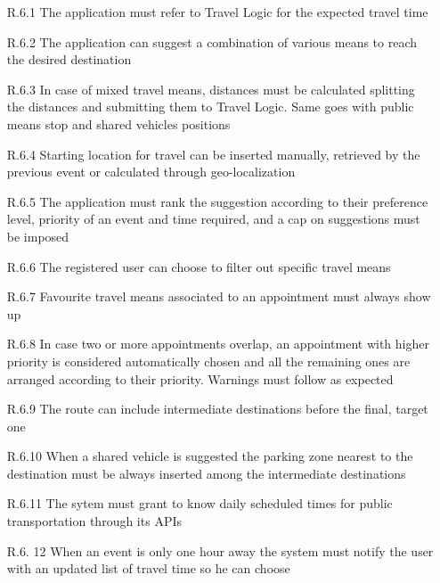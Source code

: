 \begin{itemize}
                  \begin{itemize}
                        \item [R.6.1] The application must refer to Travel Logic for the expected travel time 
                        \item [R.6.2] The application can suggest a combination of various means to reach the desired destination
                        \item [R.6.3] In case of mixed travel means, distances must be calculated splitting the distances and submitting them to Travel Logic. Same goes with public means stop and shared vehicles positions
                        \item [R.6.4] Starting location for travel can be inserted manually, retrieved by the previous event or calculated through geo-localization
                        \item [R.6.5] The application must rank the suggestion according to their preference level, priority of an event and time required, and a cap on suggestions must be imposed
                        \item [R.6.6] The registered user can choose to filter out specific travel means
                        \item [R.6.7] Favourite travel means associated to an appointment must always show up
                        \item [R.6.8] In case two or more appointments overlap, an appointment with higher priority is considered automatically chosen and all the remaining ones are arranged according to their priority. Warnings must follow as expected
                        \item [R.6.9] The route can include intermediate destinations before the final, target one 
                        \item [R.6.10] When a shared vehicle is suggested the parking zone nearest to the destination must be always inserted among the intermediate destinations 
                        \item [R.6.11] The sytem must grant to know daily scheduled times for public transportation through its APIs
                        \item [R.6.	12] When an event is only one hour away the system must notify the user with an updated list of travel time so he can choose
                       
                        
                        
                  \end{itemize}
                  

\end{itemize}

